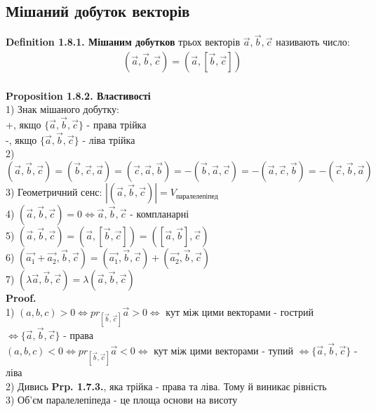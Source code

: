 \documentclass[a4paper, 14pt]{extarticle}
\def\defin#1{\textbf{Definition {#1}}}
\def\prp#1{\textbf{Proposition {#1}}}
\def\proof{\textbf{Proof.}\\}
\def\bigline{\vspace{5mm}\\}
\begin{document}
\subsection{Мішаний добуток векторів}
\defin{1.8.1. Мішаним добутков} трьох векторів $\vec{a}, \vec{b}, \vec{c}$ називають число:
\begin{align*}
(\vec{a}, \vec{b}, \vec{c}) = (\vec{a}, [\vec{b}, \vec{c}])
\end{align*}
\\
\prp{1.8.2. Властивості}\\
1) Знак мішаного добутку:\\
+, якщо $\{\vec{a}, \vec{b}, \vec{c}\}$ - права трійка\\
-, якщо $\{\vec{a}, \vec{b}, \vec{c}\}$ - ліва трійка\\
2) $(\vec{a}, \vec{b}, \vec{c}) = (\vec{b}, \vec{c}, \vec{a}) = (\vec{c}, \vec{a}, \vec{b}) = -(\vec{b}, \vec{a}, \vec{c}) = -(\vec{a}, \vec{c}, \vec{b}) = -(\vec{c}, \vec{b}, \vec{a})$\\
3) Геометричний сенс: $|(\vec{a}, \vec{b}, \vec{c})| = V_{\textrm{паралелепіпед}}$\\
4) $(\vec{a}, \vec{b}, \vec{c}) = 0 \iff \vec{a}, \vec{b}, \vec{c}$ - компланарні\\
5) $(\vec{a}, \vec{b}, \vec{c}) = (\vec{a}, [\vec{b}, \vec{c}]) = ([\vec{a},\vec{b}],\vec{c})$\\
6) $(\vec{a_1}+\vec{a_2}, \vec{b}, \vec{c}) = (\vec{a_1},\vec{b},\vec{c}) + (\vec{a_2},\vec{b},\vec{c})$\\
7) $(\lambda \vec{a}, \vec{b}, \vec{c}) = \lambda (\vec{a},\vec{b},\vec{c})$\\
\proof
1) $(a,b,c) > 0 \iff pr_{[\vec{b}, \vec{c}]} \vec{a} > 0 \iff$ кут між цими векторами - гострий $\iff \{\vec{a}, \vec{b}, \vec{c}\}$ - права\\
$(a,b,c) < 0 \iff pr_{[\vec{b}, \vec{c}]} \vec{a} < 0 \iff$ кут між цими векторами - тупий $\iff \{\vec{a}, \vec{b}, \vec{c}\}$ - ліва
\bigline
2) Дивись \textbf{Prp. 1.7.3.}, яка трійка - права та ліва. Тому й виникає рівність \bigline
3) Об'єм паралелепіпеда - це площа основи на висоту\\
\\
\end{document}
